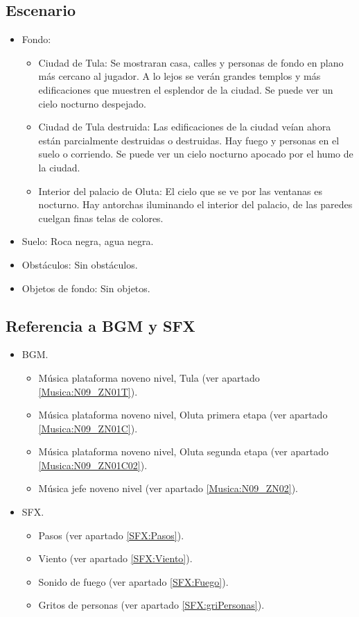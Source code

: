 	\subsection{Escenario}
\begin{itemize} 
	\item Fondo: 
		\begin{itemize}
			\item Ciudad de Tula: Se mostraran casa, calles y personas de fondo en plano más cercano al jugador. A lo lejos se verán grandes templos y más edificaciones que muestren el esplendor de la ciudad. Se puede ver un cielo nocturno despejado.
			\item Ciudad de Tula destruida: Las edificaciones de la ciudad veían ahora están parcialmente destruidas o destruidas. Hay fuego y personas en el suelo o corriendo. Se puede ver un cielo nocturno apocado por el humo de la ciudad.
			\item Interior del palacio de Oluta: El cielo que se ve por las ventanas es nocturno. Hay antorchas iluminando el interior del palacio, de las paredes cuelgan finas telas de colores.
		\end{itemize}
	\item Suelo: Roca negra, agua negra.
	\item Obstáculos: Sin obstáculos.
	\item Objetos de fondo: Sin objetos.
\end{itemize}	
	\subsection{Referencia a BGM y SFX}
	\begin{itemize}
		\item BGM.
			\begin{itemize}
				\item Música plataforma noveno nivel, Tula (ver apartado \ref{Musica:N09_ZN01T}).
				\item Música plataforma noveno nivel, Oluta primera etapa (ver apartado \ref{Musica:N09_ZN01C}).
				\item Música plataforma noveno nivel, Oluta segunda etapa (ver apartado \ref{Musica:N09_ZN01C02}).
				\item Música jefe noveno nivel (ver apartado \ref{Musica:N09_ZN02}).
			\end{itemize}
		\item SFX.
			\begin{itemize}
				\item Pasos (ver apartado \ref{SFX:Pasos}).
				\item Viento (ver apartado \ref{SFX:Viento}).
				\item Sonido de fuego (ver apartado \ref{SFX:Fuego}).
				\item Gritos de personas (ver apartado \ref{SFX:griPersonas}).
			\end{itemize}
	\end{itemize}
